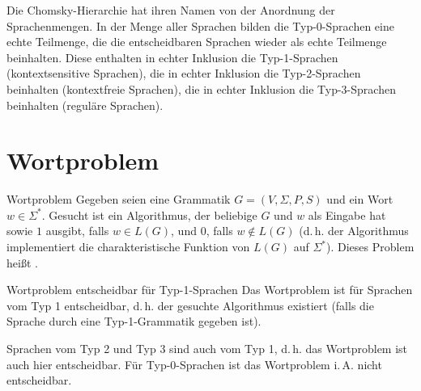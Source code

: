 \begin{Bem}
    Die Chomsky-Hierarchie hat ihren Namen von der Anordnung der
    Sprachenmengen.
    In der Menge aller Sprachen bilden die Typ-0-Sprachen eine echte Teilmenge,
    die die entscheidbaren Sprachen wieder als echte Teilmenge beinhalten.
    Diese enthalten in echter Inklusion die Typ-1-Sprachen
    (kontextsensitive Sprachen),
    die in echter Inklusion die Typ-2-Sprachen beinhalten
    (kontextfreie Sprachen),
    die in echter Inklusion die Typ-3-Sprachen beinhalten
    (reguläre Sprachen).
\end{Bem}

\pagebreak

\section{%
    Wortproblem%
}

\begin{Def}{Wortproblem}
    Gegeben seien eine Grammatik $G = (V, \Sigma, P, S)$ und ein Wort
    $w \in \Sigma^\ast$.
    Gesucht ist ein Algorithmus, der beliebige $G$ und $w$ als Eingabe hat
    sowie $1$ ausgibt, falls $w \in L(G)$, und
    $0$, falls $w \notin L(G)$
    (d.\,h. der Algorithmus implementiert die charakteristische Funktion
    von $L(G)$ auf $\Sigma^\ast$).
    Dieses Problem heißt .
\end{Def}

\begin{Satz}{Wortproblem entscheidbar für Typ-1-Sprachen}
    Das Wortproblem ist für Sprachen vom Typ 1 entscheidbar,
    d.\,h. der gesuchte Algorithmus existiert
    (falls die Sprache durch eine Typ-1-Grammatik gegeben ist).
\end{Satz}

\begin{Bem}
    Sprachen vom Typ 2 und Typ 3 sind auch vom Typ 1, d.\,h.
    das Wortproblem ist auch hier entscheidbar.
    Für Typ-0-Sprachen ist das Wortproblem i.\,A. nicht entscheidbar.
\end{Bem}


